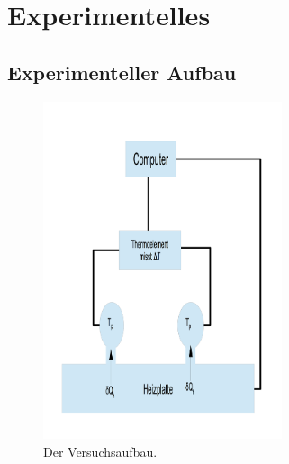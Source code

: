 \documentclass[a4paper,12pt,oneside,onecolum,final,openany]{report}
\begin{document}
\begin{titlepage}
\vspace{1.3cm} 


\end{titlepage}




\tableofcontents
\chapter{Experimentelles}
\section{Experimenteller Aufbau}
\begin{figure}[h]
\centering
\includegraphics[width=7cm]{VB.png}
\caption{Der Versuchsaufbau.}
\end{figure} 
\FloatBarrier
\end{document}

